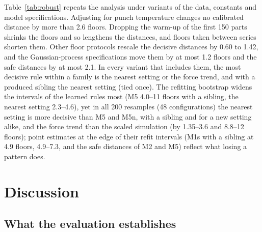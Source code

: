 \documentclass[pdflatex,sn-basic,lineno]{sn-jnl}
\begin{document}
Table~\ref{tab:robust} repeats the analysis under variants of the data, constants and model specifications. Adjusting for punch temperature changes no calibrated distance by more than 2.6 floors. Dropping the warm-up of the first 150 parts shrinks the floors and so lengthens the distances, and floors taken between series shorten them. Other floor protocols rescale the decisive distances by 0.60 to 1.42, and the Gaussian-process specifications move them by at most 1.2 floors and the safe distances by at most 2.1. In every variant that includes them, the most decisive rule within a family is the nearest setting or the force trend, and with a produced sibling the nearest setting (tied once). The refitting bootstrap widens the intervals of the learned rules most (M5 4.0--11 floors with a sibling, the nearest setting 2.3--4.6), yet in all 200 resamples (48 configurations) the nearest setting is more decisive than M5 and M5n, with a sibling and for a new setting alike, and the force trend than the scaled simulation (by 1.35--3.6 and 8.8--12 floors); point estimates at the edge of their refit intervals (M1s with a sibling at 4.9 floors, 4.9--7.3, and the safe distances of M2 and M5) reflect what losing a pattern does.

\section{Discussion}\label{sec:discussion}

\subsection{What the evaluation establishes}
\end{document}
